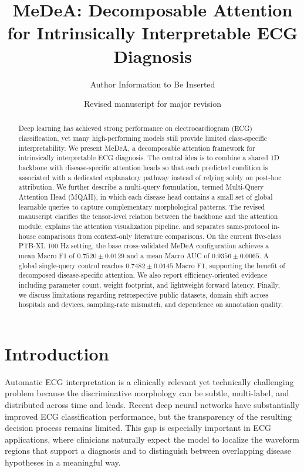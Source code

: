\documentclass[11pt]{article}
\title{\textbf{MeDeA: Decomposable Attention for Intrinsically Interpretable ECG Diagnosis}}
\author{Author Information to Be Inserted}
\date{Revised manuscript for major revision}
\begin{document}
\maketitle

\begin{abstract}
Deep learning has achieved strong performance on electrocardiogram (ECG) classification, yet many high-performing models still provide limited class-specific interpretability. We present MeDeA, a decomposable attention framework for intrinsically interpretable ECG diagnosis. The central idea is to combine a shared 1D backbone with disease-specific attention heads so that each predicted condition is associated with a dedicated explanatory pathway instead of relying solely on post-hoc attribution. We further describe a multi-query formulation, termed Multi-Query Attention Head (MQAH), in which each disease head contains a small set of global learnable queries to capture complementary morphological patterns. The revised manuscript clarifies the tensor-level relation between the backbone and the attention module, explains the attention visualization pipeline, and separates same-protocol in-house comparisons from context-only literature comparisons. On the current five-class PTB-XL 100 Hz setting, the base cross-validated MeDeA configuration achieves a mean Macro F1 of $0.7520 \pm 0.0129$ and a mean Macro AUC of $0.9356 \pm 0.0065$. A global single-query control reaches $0.7482 \pm 0.0145$ Macro F1, supporting the benefit of decomposed disease-specific attention. We also report efficiency-oriented evidence including parameter count, weight footprint, and lightweight forward latency. Finally, we discuss limitations regarding retrospective public datasets, domain shift across hospitals and devices, sampling-rate mismatch, and dependence on annotation quality.
\end{abstract}

\section{Introduction}

Automatic ECG interpretation is a clinically relevant yet technically challenging problem because the discriminative morphology can be subtle, multi-label, and distributed across time and leads. Recent deep neural networks have substantially improved ECG classification performance, but the transparency of the resulting decision process remains limited. This gap is especially important in ECG applications, where clinicians naturally expect the model to localize the waveform regions that support a diagnosis and to distinguish between overlapping disease hypotheses in a meaningful way.
\end{document}
